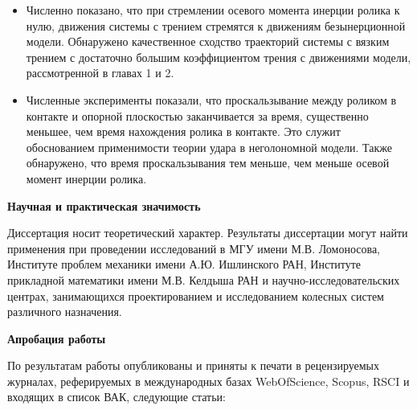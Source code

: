 \begin{itemize}
{        }
        \item {
            Численно показано, что при стремлении осевого момента инерции ролика к нулю, движения системы с трением стремятся к движениям безынерционной модели. Обнаружено качественное сходство траекторий системы с вязким трением с достаточно большим коэффициентом трения с движениями модели, рассмотренной в главах 1 и 2.
        }
        \item {
            Численные эксперименты показали, что проскальзывание между роликом в контакте и опорной плоскостью заканчивается за время, существенно меньшее, чем время нахождения ролика в контакте. Это служит обоснованием применимости теории удара в неголономной модели. Также обнаружено, что время проскальзывания тем меньше, чем меньше осевой момент инерции ролика.
        }
\end{itemize}

\textbf{Научная и практическая значимость}

Диссертация носит теоретический характер. Результаты диссертации могут найти применения при проведении исследований в МГУ имени М.В. Ломоносова, Институте проблем механики имени А.Ю. Ишлинского РАН, Институте прикладной математики имени М.В. Келдыша РАН и научно-иссле\-до\-ва\-тель\-ских центрах, занимающихся проектированием и исследованием колесных систем различного назначения.

\textbf{Апробация работы}

По результатам работы опубликованы и приняты к печати в рецензируемых журналах, реферируемых в международных базах WebOfScience, Scopus, RSCI и входящих в список ВАК, следующие статьи: 

